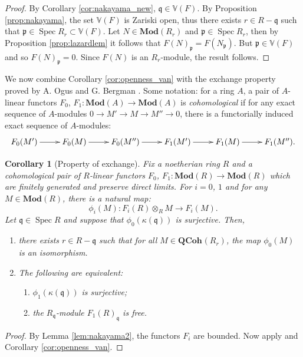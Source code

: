 \documentclass{amsart}
\theoremstyle{plain}
\newtheorem{cor}[thm]{Corollary}
\theoremstyle{definition}
\theoremstyle{remark}
\numberwithin{equation}{section}
\DeclareMathOperator{\spec}{Spec}
\newcommand{\QCOHB}{\mathbf{QCoh}}
\newcommand{\QCOH}[2][]{\QCOHB^{#1}({#2})}
\newcommand{\MOD}[1]{\mathbf{Mod}({#1})}
\newcommand{\tensor}{\otimes}
\newcommand{\Van}{\mathbb{V}}
\newcommand{\fndefn}[1]{\emph{{#1}}}
\begin{document}
\begin{proof}
  By Corollary \ref{cor:nakayama_new}, $\mathfrak{q} \in \Van(F)$. By
  Proposition \ref{prop:nakayama}, the set $\Van(F)$ is Zariski open,
  thus there exists $r\in R-\mathfrak{q}$ such that
  $\mathfrak{p} \in \spec R_r \subset \Van(F)$. Let $N\in \MOD{R_r}$
  and $\mathfrak{p} \in \spec R_r$, then by Proposition
  \ref{prop:lazardlem} it follows that $F(N)_{\mathfrak{p}} =
  F(N_{\mathfrak{p}})$. But $\mathfrak{p} \in \Van(F)$ and so
  $F(N)_{\mathfrak{p}} = 0$. Since $F(N)$ is an $R_r$-module, the
  result follows. 
\end{proof}
We now combine Corollary \ref{cor:openness_van} with the exchange
property proved by A. Ogus and G. Bergman
\cite[Cor.\ 5.1]{MR0302633}. Some notation: for a ring $A$, a
pair of $A$-linear functors $F_0$, $F_1 : \MOD{A} \to \MOD{A}$ is
\fndefn{cohomological} if for any exact sequence of $A$-modules $0 \to
M' \to M \to M'' \to 0$, there is a functorially induced exact
sequence of $A$-modules:
\[
\xymatrix{F_0(M') \ar[r] & F_0(M) \ar[r] & F_0(M'') \ar[r] & F_1(M')
  \ar[r] & F_1(M) \ar[r] & F_1(M'').}
\]
\begin{cor}[Property of exchange]\label{cor:prop_exch_fg}
  Fix a noetherian ring $R$ and a cohomological pair of $R$-linear 
  functors $F_0$, $F_1 :\MOD{R} \to \MOD{R}$ which  are finitely
  generated and preserve direct limits. For $i=0$, $1$ and for any
  $M\in \MOD{R}$, there is a natural map:
  \[
  \phi_i(M) :  F_i(R) \tensor_R M \to F_i(M). 
  \]
  Let $\mathfrak{q} \in \spec R$ and suppose that
  $\phi_0(\kappa(\mathfrak{q}))$ is surjective. Then,
  \begin{enumerate}
  \item there exists $r\in R-\mathfrak{q}$ such that for all $M\in
    \QCOH{R_r}$, the map $\phi_0(M)$ is an isomorphism.
  \item The following are equivalent:
    \begin{enumerate}
    \item $\phi_1(\kappa(\mathfrak{q}))$ is surjective;
    \item the $R_{\mathfrak{q}}$-module $F_1(R)_{\mathfrak{q}}$ is
      free. 
    \end{enumerate}
  \end{enumerate}
\end{cor}
\begin{proof}
  By Lemma \ref{lem:nakayama2}, the functors $F_i$ are bounded. Now
  apply \cite[Cor.\ 5.1]{MR0302633} and Corollary
  \ref{cor:openness_van}. 
\end{proof}
\end{document}
